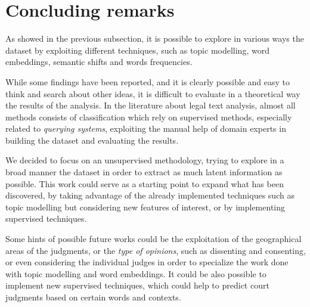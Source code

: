 \section{Concluding remarks}
As showed in the previous subsection, it is possible to explore
in various ways the dataset by exploiting different techniques, such as topic modelling, word embeddings, semantic
shifts and words frequencies.

While some findings have been reported, and it is clearly possible and easy to think and search about other ideas,
it is difficult to evaluate in a theoretical way the results of the analysis. In the literature about
legal text analysis, almost all methods consists of classification which rely on supervised methods, 
especially related to \emph{querying systems}, exploiting the manual help of domain experts in building the dataset 
and evaluating the results.~\cite{caselaw_query}

We decided to focus on an unsupervised methodology, trying to explore in a broad manner the dataset in order to
extract as much latent information as possible. This work could serve as a starting point to expand what has been
discovered, by taking advantage of the already implemented techniques such as topic modelling but considering new
features of interest, or by implementing supervised techniques.

Some hints of possible future works could be the exploitation of the geographical areas of the judgments,
or the \emph{type of
opinions}, such as dissenting and consenting, or even considering the individual judges in order to specialize
the work done with topic modelling and word embeddings. It could be also possible to implement new supervised techniques,
which could help to predict court judgments based on certain words and contexts.~\cite{argumentation_mining}